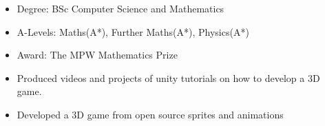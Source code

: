 \documentclass[10pt,a4paper,ragged2e]{altacv}
\begin{document}
\tagline{}

\begin{fullwidth}
\makecvheader
\end{fullwidth}





\begin {itemize}
\item Degree: BSc Computer Science and Mathematics
\end{itemize}

\begin{itemize}
\item A-Levels:	Maths(A*), Further Maths(A*), Physics(A*)
\item Award: The MPW Mathematics Prize
\end{itemize}



\begin{itemize}

\item Produced videos and projects of unity tutorials on how to develop a 3D game.
\item Developed a 3D game from open source sprites and animations

\end{itemize}
\end{document}
